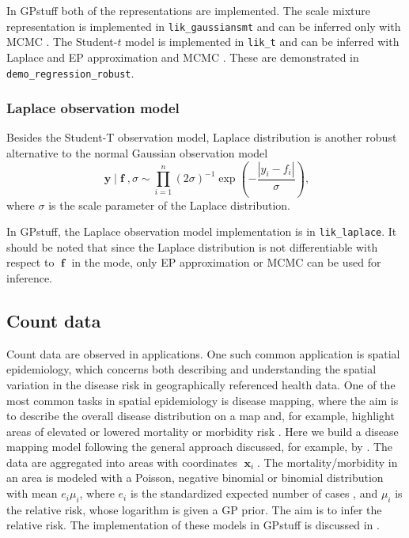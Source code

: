 \documentclass[twoside,11pt]{article}
\DeclareMathOperator{\x}{\mathbf{x}}
\DeclareMathOperator{\f}{\mathbf{f}}
\DeclareMathOperator{\y}{\mathbf{y}}
\newcommand{\pkg}[1]{{\fontseries{b}\selectfont #1}}
\newcommand{\code}[1]{{\normalfont\texttt{#1}}}
\begin{document}
In \pkg{GPstuff} both of the representations are implemented. The
scale mixture representation is implemented in
\code{lik\_gaussiansmt} and can be inferred only with MCMC \citep[as
described by][]{Neal:1998}. The Student-$t$ model is
implemented in \code{lik\_t} and can be inferred with Laplace and EP
approximation and MCMC \citep[as described
by][]{Vanhatalo+Jylanki+Vehtari:2009,Jylanki+Vanhatalo+Vehtari:2011}.
These are demonstrated in \code{demo\_regression\_robust}.

\subsubsection{Laplace observation model}

Besides the Student-T observation model, Laplace distribution is another robust alternative to the normal 
Gaussian observation model
%
\begin{equation}
 \y | \f, \sigma  \sim \prod_{i=1}^n \left( 2\sigma \right)^{-1} \exp \left( -\frac{|y_i - f_i|}{\sigma} \right),
\end{equation}
%
where $\sigma$ is the scale parameter of the Laplace distribution. 

In \pkg{GPstuff}, the Laplace observation model implementation is in \code{lik\_laplace}. It should be noted that since the Laplace distribution is 
not differentiable with respect to $\f$ in the mode, only EP approximation or MCMC can be used for inference. 
\subsection{Count data}\label{sec_spatial_demo1}

Count data are observed in applications. One such common application
is spatial epidemiology, which concerns both describing and
understanding the spatial variation in the disease risk in
geographically referenced health data. One of the most common tasks in
spatial epidemiology is disease mapping, where the aim is to describe
the overall disease distribution on a map and, for example, highlight
areas of elevated or lowered mortality or morbidity risk
\citep[e.g.][]{Lawson:2001,Richardson:2003,Elliot+Wakefield+Best+Briggs:2001}.
Here we build a disease mapping model following the general approach
discussed, for example, by \citet{Best+Richardson+Thomson:2005}. The
data are aggregated into areas with coordinates $\x_i$. The
mortality/morbidity in an area is modeled with a Poisson, negative
binomial or binomial distribution with mean $e_i\mu_i$, where $e_i$ is
the standardized expected number of cases
\citep[e.g.][]{Ahmad+all:2000}, and $\mu_i$ is the relative risk,
whose logarithm is given a GP prior. The aim is to infer the relative
risk. The implementation of these models in \pkg{GPstuff} is discussed
in \citep{Vanhatalo+Vehtari:2007,Vanhatalo+Pietilainen+Vehtari:2010}.
\end{document}
